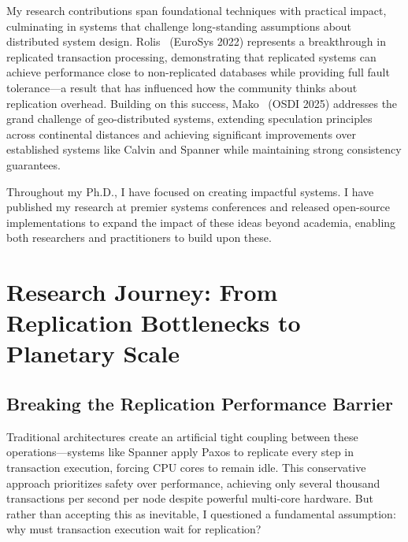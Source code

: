 \documentclass[11pt,letterpaper]{article}
\begin{document}
My research contributions span foundational techniques with practical impact, culminating in systems that challenge long-standing assumptions about distributed system design. Rolis~\cite{shen2022rolis} (EuroSys 2022) represents a breakthrough in replicated transaction processing, demonstrating that replicated systems can achieve performance close to non-replicated databases while providing full fault tolerance—a result that has influenced how the community thinks about replication overhead. 
Building on this success, Mako~\cite{shen2025mako} (OSDI 2025) addresses the grand challenge of geo-distributed systems, extending speculation principles across continental distances and achieving significant improvements over established systems like Calvin and Spanner while maintaining strong consistency guarantees.

Throughout my Ph.D., I have focused on creating impactful systems. I have published my research at premier systems conferences and released open-source implementations to expand the impact of these ideas beyond academia, enabling both researchers and practitioners to build upon these.


\section{Research Journey: From Replication Bottlenecks to Planetary Scale}

\subsection{Breaking the Replication Performance Barrier}
Traditional architectures create an artificial tight coupling between these operations—systems like Spanner apply Paxos to replicate every step in transaction execution, forcing CPU cores to remain idle. This conservative approach prioritizes safety over performance, achieving only several thousand transactions per second per node despite powerful multi-core hardware.
But rather than accepting this as inevitable, I questioned a fundamental assumption: why must transaction execution wait for replication? 
\end{document}
